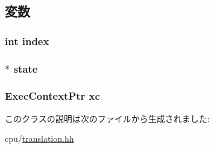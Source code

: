 \subsection{変数}
\hypertarget{classDataTranslation_a750b5d744c39a06bfb13e6eb010e35d0}{
\subsubsection[{index}]{\setlength{\rightskip}{0pt plus 5cm}int {\bf index}}}
\label{classDataTranslation_a750b5d744c39a06bfb13e6eb010e35d0}
\hypertarget{classDataTranslation_a70366c1ef6f173eb70265992cf6495bf}{
\subsubsection[{state}]{$\ast$ {\bf state}}}
\label{classDataTranslation_a70366c1ef6f173eb70265992cf6495bf}
\hypertarget{classDataTranslation_a5a1319d106e664e08fe03cc819c9354d}{
\subsubsection[{xc}]{\setlength{\rightskip}{0pt plus 5cm}ExecContextPtr {\bf xc}}}
\label{classDataTranslation_a5a1319d106e664e08fe03cc819c9354d}


このクラスの説明は次のファイルから生成されました:\begin{DoxyCompactItemize}
\item 
cpu/\hyperlink{translation_8hh}{translation.hh}\end{DoxyCompactItemize}
